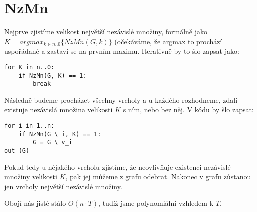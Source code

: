\documentclass[a4paper]{article}
\begin{document}
\renewcommand{\headrulewidth}{0pt} %
\thispagestyle{fancy} %
{}

\section*{NzMn}
Nejprve zjistíme velikost největší nezávislé množiny, formálně jako $K = argmax_{k \in n..0} \{ NzMn(G,k) \}$ (očekáváme, že argmax to prochází uspořádaně a zastaví se na prvním maximu. Iterativně by to šlo zapsat jako:

\begin{lstlisting}
for K in n..0:
	if NzMn(G, K) == 1:
		break
\end{lstlisting}

Následně budeme procházet všechny vrcholy a u každého rozhodneme, zdali existuje nezávislá množina velikosti $K$ s ním, nebo bez něj. V kódu by šlo zapsat:

\begin{lstlisting}
for i in 1..n:
	if NzMn(G \ i, K) == 1:
		G = G \ v_i		
out (G)
\end{lstlisting}

Pokud tedy u nějakého vrcholu zjistíme, že neovlivňuje existenci nezávislé množiny velikosti $K$, pak jej můžeme z grafu odebrat. Nakonec v grafu zůstanou jen vrcholy největší nezávislé množiny.

Obojí nás jistě stálo $O(n \cdot T)$, tudíž jsme polynomiální vzhledem k $T$.
\end{document}
